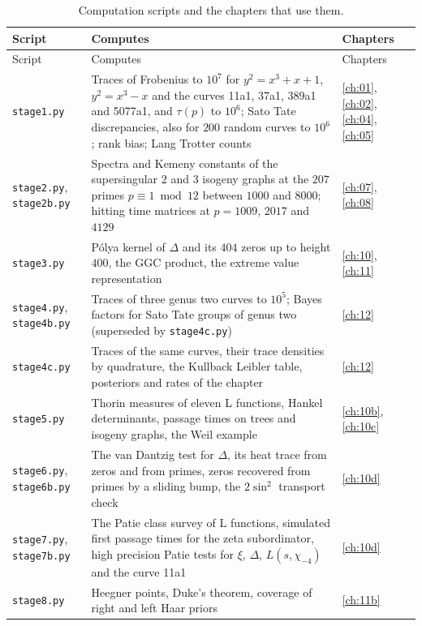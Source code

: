 {\footnotesize\setlength{\tabcolsep}{4pt}
\begin{longtable}{p{1.4in}p{2.95in}p{0.6in}}
\caption{Computation scripts and the chapters that use them.}\label{tab:B:scripts}\\
\toprule
Script & Computes & Chapters\\
\midrule
\endfirsthead
\toprule
Script & Computes & Chapters\\
\midrule
\endhead
\texttt{stage1.py} & Traces of Frobenius to $10^7$ for $y^2=x^3+x+1$, $y^2=x^3-x$ and the curves 11a1, 37a1, 389a1 and 5077a1, and $\tau(p)$ to $10^6$; Sato Tate discrepancies, also for $200$ random curves to $10^6$; rank bias; Lang Trotter counts & \ref{ch:01}, \ref{ch:02}, \ref{ch:04}, \ref{ch:05}\\
\texttt{stage2.py}, \texttt{stage2b.py} & Spectra and Kemeny constants of the supersingular $2$ and $3$ isogeny graphs at the $207$ primes $p\equiv1\bmod12$ between $1000$ and $8000$; hitting time matrices at $p=1009$, $2017$ and $4129$ & \ref{ch:07}, \ref{ch:08}\\
\texttt{stage3.py} & P\'olya kernel of $\Delta$ and its $404$ zeros up to height $400$, the GGC product, the extreme value representation & \ref{ch:10}, \ref{ch:11}\\
\texttt{stage4.py}, \texttt{stage4b.py} & Traces of three genus two curves to $10^5$; Bayes factors for Sato Tate groups of genus two (superseded by \texttt{stage4c.py}) & \ref{ch:12}\\
\texttt{stage4c.py} & Traces of the same curves, their trace densities by quadrature, the Kullback Leibler table, posteriors and rates of the chapter & \ref{ch:12}\\
\texttt{stage5.py} & Thorin measures of eleven L functions, Hankel determinants, passage times on trees and isogeny graphs, the Weil example & \ref{ch:10b}, \ref{ch:10c}\\
\texttt{stage6.py}, \texttt{stage6b.py} & The van Dantzig test for $\Delta$, its heat trace from zeros and from primes, zeros recovered from primes by a sliding bump, the $2\sin^2$ transport check & \ref{ch:10d}\\
\texttt{stage7.py}, \texttt{stage7b.py} & The Patie class survey of L functions, simulated first passage times for the zeta subordinator, high precision Patie tests for $\xi$, $\Delta$, $L(s,\chi_{-4})$ and the curve 11a1 & \ref{ch:10d}\\
\texttt{stage8.py} & Heegner points, Duke's theorem, coverage of right and left Haar priors & \ref{ch:11b}\\

\end{longtable}}
